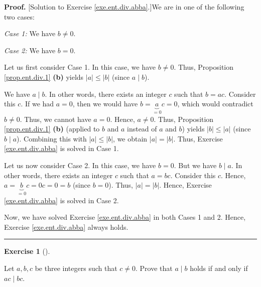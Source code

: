 \documentclass[numbers=enddot,12pt,final,onecolumn,notitlepage]{scrartcl}%
\newcounter{exer}
\numberwithin{exer}{subsection}
\theoremstyle{definition}
\newtheorem{exmp}[exer]{Exercise}
\newenvironment{exercise}[1][]
{\begin{exmp}[#1]\begin{leftbar}}
{\end{leftbar}\end{exmp}}
\newenvironment{fineprint}{\begin{small}}{\end{small}}
\newenvironment{proof}[1][Proof]{\noindent\textbf{#1.} }{\ \rule{0.5em}{0.5em}}
\begin{document}
\begin{fineprint}
\begin{proof}
[Solution to Exercise \ref{exe.ent.div.abba}.]We are in one of the following
two cases:

\textit{Case 1:} We have $b\neq0$.

\textit{Case 2:} We have $b=0$.

Let us first consider Case 1. In this case, we have $b\neq0$. Thus,
Proposition \ref{prop.ent.div.1} \textbf{(b)} yields $\left\vert a\right\vert
\leq\left\vert b\right\vert $ (since $a\mid b$).

We have $a\mid b$. In other words, there exists an integer $c$ such that
$b=ac$. Consider this $c$. If we had $a=0$, then we would have
$b=\underbrace{a}_{=0}c=0$, which would contradict $b\neq0$. Thus, we cannot
have $a=0$. Hence, $a\neq0$. Thus, Proposition \ref{prop.ent.div.1}
\textbf{(b)} (applied to $b$ and $a$ instead of $a$ and $b$) yields
$\left\vert b\right\vert \leq\left\vert a\right\vert $ (since $b\mid a$).
Combining this with $\left\vert a\right\vert \leq\left\vert b\right\vert $, we
obtain $\left\vert a\right\vert =\left\vert b\right\vert $. Thus, Exercise
\ref{exe.ent.div.abba} is solved in Case 1.

Let us now consider Case 2. In this case, we have $b=0$. But we have $b\mid
a$. In other words, there exists an integer $c$ such that $a=bc$. Consider
this $c$. Hence, $a=\underbrace{b}_{=0}c=0c=0=b$ (since $b=0$). Thus,
$\left\vert a\right\vert =\left\vert b\right\vert $. Hence, Exercise
\ref{exe.ent.div.abba} is solved in Case 2.

Now, we have solved Exercise \ref{exe.ent.div.abba} in both Cases 1 and 2.
Hence, Exercise \ref{exe.ent.div.abba} always holds.
\end{proof}
\end{fineprint}

\begin{exercise}
\label{exe.ent.div.acbc}Let $a,b,c$ be three integers such that $c\neq0$.
Prove that $a\mid b$ holds if and only if $ac\mid bc$.
\end{exercise}
\end{document}
